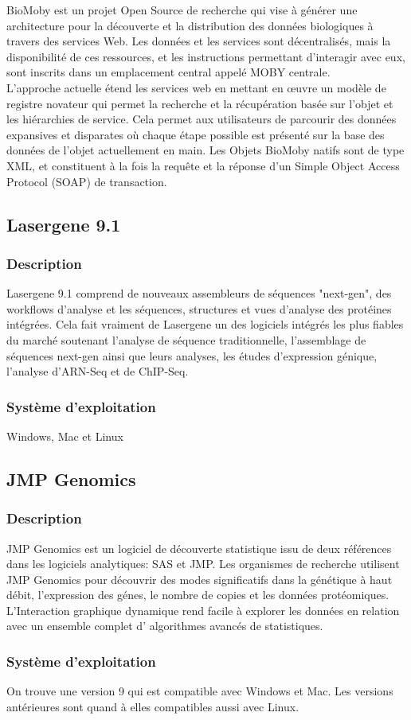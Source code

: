 BioMoby est un projet Open Source de recherche qui vise à générer une architecture pour la découverte et la distribution des données biologiques à travers des services Web. Les données et les services sont décentralisés, mais la disponibilité de ces ressources, et les instructions permettant d'interagir avec eux, sont inscrits dans un emplacement central appelé MOBY centrale.\\
L'approche actuelle étend les services web en mettant en œuvre un modèle de registre novateur qui permet la recherche et la récupération basée sur l'objet et les hiérarchies de service. Cela permet aux utilisateurs de parcourir des données expansives et disparates où chaque étape possible est présenté sur la base des données de l'objet actuellement en main. Les Objets BioMoby natifs sont de type XML, et constituent à la fois la requête et la réponse d'un Simple Object Access Protocol (SOAP) de transaction.



\subsection{Lasergene 9.1}
\subsubsection{Description}
Lasergene 9.1 comprend de nouveaux assembleurs de séquences "next-gen", des workflows d'analyse et les séquences, structures et vues d'analyse des protéines intégrées. Cela fait  vraiment de Lasergene un des logiciels  intégrés les plus fiables du marché soutenant l'analyse de séquence traditionnelle, l'assemblage de séquences next-gen ainsi que leurs analyses, les études d'expression génique, l'analyse d'ARN-Seq et de ChIP-Seq.
\subsubsection{Système d'exploitation}
Windows, Mac et Linux
\subsection{JMP Genomics}
\subsubsection{Description}
JMP Genomics est un logiciel de découverte statistique issu de deux références dans les logiciels analytiques: SAS et JMP. Les organismes de recherche utilisent JMP Genomics pour découvrir des modes significatifs dans la génétique à haut débit, l'expression des génes, le nombre de copies et les données protéomiques. L'Interaction graphique dynamique rend facile à explorer les données en relation avec un ensemble complet d' algorithmes avancés de statistiques.

\subsubsection{Système d'exploitation}
On trouve une version 9 qui est compatible avec Windows et Mac. Les versions antérieures sont quand à elles compatibles aussi avec Linux.